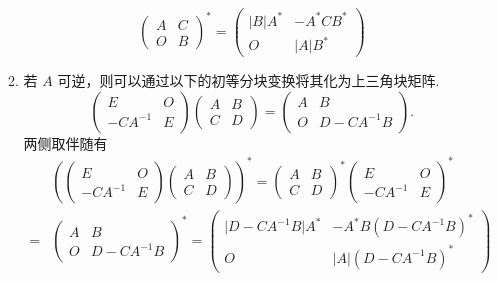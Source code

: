 \begin{enumerate}
\begin{enumerate}
\[\begin{pmatrix}
            A & C \\
            O & B
        \end{pmatrix}^* = \begin{pmatrix}
            \lvert B \rvert A^* & -A^*CB^* \\
            O & \lvert A \rvert B^*
        \end{pmatrix}\]
        \item 若 $A$ 可逆，则可以通过以下的初等分块变换将其化为上三角块矩阵. \[\begin{pmatrix}
            E & O \\
            -CA^{-1} & E
        \end{pmatrix} \begin{pmatrix}
            A & B \\
            C & D
        \end{pmatrix} = \begin{pmatrix}
            A & B \\
            O & D-CA^{-1}B
        \end{pmatrix}.\] 两侧取伴随有 \begin{align*}
            & \left(\begin{pmatrix}
                E & O \\
                -CA^{-1} & E
            \end{pmatrix} \begin{pmatrix}
                A & B \\
                C & D
            \end{pmatrix}\right)^* = \begin{pmatrix}
                A & B \\
                C & D
            \end{pmatrix}^* \begin{pmatrix}
                E & O \\
                -CA^{-1} & E
            \end{pmatrix}^* \\ ={} & \begin{pmatrix}
                A & B \\
                O & D-CA^{-1}B
            \end{pmatrix}^* = \begin{pmatrix}
                \lvert D-CA^{-1}B \rvert A^* & -A^*B(D-CA^{-1}B)^* \\
                O & \lvert A \rvert (D-CA^{-1}B)^*
            \end{pmatrix}

\end{align*}
\end{enumerate}
\end{enumerate}
